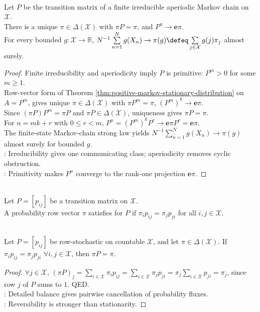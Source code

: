 \begin{theorem} \label{thm:finite-ergodic-chain-convergence} \\
Let $P$ be the transition matrix of a finite irreducible aperiodic Markov chain on $\mathcal{X}$.\\
There is a unique $\pi\in\Delta(\mathcal{X})$ with $\pi P=\pi$, and $P^n\to\mathbf{e}\pi$.\\
For every bounded $g:\mathcal{X}\to\mathbb{R}$, $N^{-1}\sum\limits_{n=1}^{N}g(X_n)\to\pi(g)\defeq\sum\limits_{j\in\mathcal{X}}g(j)\pi_j$ almost surely.
\begin{proof} Finite irreducibility and aperiodicity imply $P$ is primitive: $P^m>0$ for some $m\geq1$.\\
Row-vector form of Theorem \ref{thm:positive-markov-stationary-distribution} on $A=P^m$, gives unique $\pi\in\Delta(\mathcal{X})$ with $\pi P^m=\pi$, $(P^m)^k\to\mathbf{e}\pi$.\\
Since $(\pi P)P^m=\pi P$ and $\pi P\in\Delta(\mathcal{X})$, uniqueness gives $\pi P=\pi$.\\
For $n=mk+r$ with $0\leq r<m$, $P^n=(P^m)^kP^r\to\mathbf{e}\pi P^r=\mathbf{e}\pi$.\\
The finite-state Markov-chain strong law yields $N^{-1}\sum\limits_{n=1}^{N}g(X_n)\to\pi(g)$ almost surely for bounded $g$.\\
: Irreducibility gives one communicating class; aperiodicity removes cyclic obstruction.\\
: Primitivity makes $P^n$ converge to the rank-one projection $\mathbf{e}\pi$.
\end{proof}
\end{theorem}

\begin{definition} \label{def:detailed-balance} \\
Let $P=[p_{ij}]$ be a transition matrix on $\mathcal{X}$.\\
A probability row vector $\pi$ satisfies  for $P$ if $\pi_i p_{ij}=\pi_jp_{ji}$ for all $i,j\in\mathcal{X}$.
\end{definition}

\begin{theorem} \label{thm:detailed-balance-stationary} \\
Let $P=[p_{ij}]$ be row-stochastic on countable $\mathcal{X}$, and let $\pi\in\Delta(\mathcal{X})$. If $\pi_i p_{ij}=\pi_jp_{ji}$ $\forall i,j\in\mathcal{X}$, then $\pi P=\pi$.
\begin{proof} $\forall j\in\mathcal{X}$, $(\pi P)_j=\sum\limits_{i\in\mathcal{X}}\pi_i p_{ij}=\sum\limits_{i\in\mathcal{X}}\pi_jp_{ji}=\pi_j\sum\limits_{i\in\mathcal{X}}p_{ji}=\pi_j$, since row $j$ of $P$ sums to $1$. QED.\\
: Detailed balance gives pairwise cancellation of probability fluxes.\\
: Reversibility is stronger than stationarity.
\end{proof}
\end{theorem}

